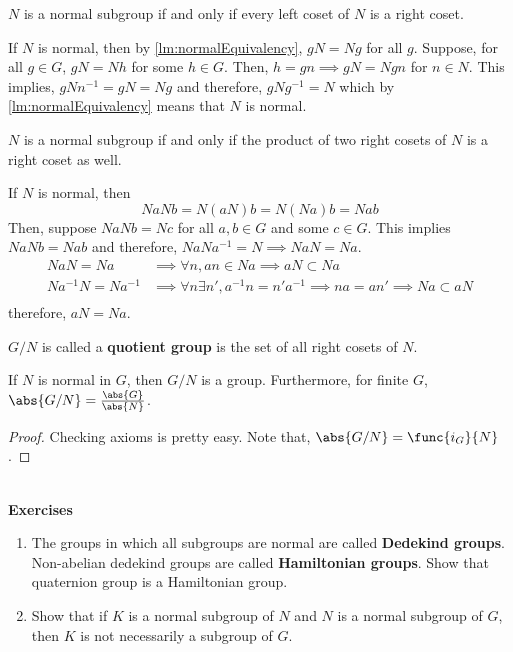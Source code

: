 \begin{lemma}
    \(N\) is a normal subgroup if and only if every left coset of \(N\) is a right coset.
\end{lemma}

\begin{prooflemma}
    If \(N\) is normal, then by \ref{lm:normalEquivalency}, \(gN = Ng\) for all \(g\). Suppose, for all \(g \in G\), \(gN = Nh\) for some \(h \in G\). Then, \(h = gn \implies gN = Ngn\) for \(n \in N\). This implies, \(gNn^{-1} = gN = Ng\) and therefore, \(gNg^{-1} = N\) which by \ref{lm:normalEquivalency} means that \(N\) is normal.
\end{prooflemma}

\begin{lemma}
    \(N\) is a normal subgroup if and only if the product of two right cosets of \(N\) is a right coset as well.
\end{lemma}

\begin{prooflemma}
    If \(N\) is normal, then 
    \begin{equation*}
        Na Nb = N (aN)b = N (Na)b = Nab
    \end{equation*}
    Then, suppose \(NaNb = Nc\) for all \(a,b \in G\) and some \(c \in G\). This implies \(NaNb = Nab\) and therefore, \(NaNa^{-1} = N \implies NaN = Na\).
    \begin{align*}
        NaN = Na &\implies \forall n, an \in Na \implies  aN \subset Na\\
        Na^{-1}N = Na^{-1} &\implies \forall n \exists n', a^{-1}n = n'a^{-1} \implies na = an' \implies Na \subset aN \\
    \end{align*}
    therefore, \(aN = Na\).
\end{prooflemma}

\begin{definition}
    \(G/N\) is called a \textbf{quotient group} is the set of all right cosets of \(N\).
\end{definition}

\begin{theorem}
    If \(N\) is normal in \(G\), then \(G/N\) is a group. Furthermore, for finite \(G\), \(\abs{G/N} = \frac{\abs{G}}{\abs{N}}\).
\end{theorem}

\begin{proof}
    Checking axioms is pretty easy. Note that, \(\abs{G/N} = \func{i_G}{N}\).
\end{proof}
\ \\ 
{\Large{\textbf{Exercises}}}
\begin{enumerate}
    \item The groups in which all subgroups are normal are called \textbf{Dedekind groups}. Non-abelian dedekind groups are called \textbf{Hamiltonian groups}. Show that quaternion group is a Hamiltonian group.
    \item Show that if \(K\) is a normal subgroup of \(N\) and \(N\) is a normal subgroup of \(G\), then \(K\) is not necessarily a subgroup of \(G\).
\end{enumerate}

